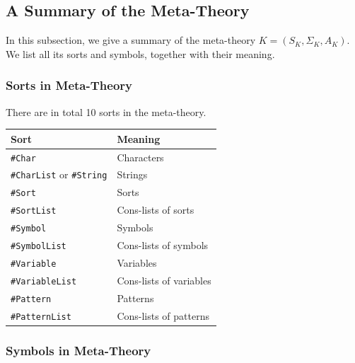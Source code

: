 \documentclass[UTF8,11pt]{article}
\theoremstyle{plain}
\theoremstyle{definition}
\theoremstyle{remark}
\newcommand{\sharpsymbol}{\#}
\newcommand{\KChar}{\texttt{\sharpsymbol Char}}
\newcommand{\KCharList}{\texttt{\sharpsymbol CharList}}
\newcommand{\KString}{\texttt{\sharpsymbol String}}
\newcommand{\KSort}{\texttt{\sharpsymbol Sort}}
\newcommand{\KSymbol}{\texttt{\sharpsymbol Symbol}}
\newcommand{\KPatternList}{\texttt{\sharpsymbol PatternList}}
\newcommand{\KSortList}{\texttt{\sharpsymbol SortList}}
\newcommand{\KSymbolList}{\texttt{\sharpsymbol SymbolList}}
\newcommand{\KVariableList}{\texttt{\sharpsymbol VariableList}}
\newcommand{\KVariable}{\texttt{\sharpsymbol Variable}}
\newcommand{\KPattern}{\texttt{\sharpsymbol Pattern}}
\begin{document}
\subsection{A Summary of the Meta-Theory}
\label{sec:K-summary}
In this subsection, we give a summary of the meta-theory $K = (S_K, \Sigma_K, 
A_K)$.
We list all its sorts and symbols, together with their meaning.

\subsubsection{Sorts in Meta-Theory}
There are in total 10 sorts in the meta-theory.
\begin{center}
	\begin{tabular}{l|l}
		\textbf{Sort} & \textbf{Meaning} \\
		\hline
		\KChar & Characters \\
		{\KCharList} or \KString & Strings \\
		\KSort & Sorts \\
		\KSortList & Cons-lists of sorts \\
		\KSymbol & Symbols \\
		\KSymbolList & Cons-lists of symbols \\
		\KVariable & Variables \\
		\KVariableList & Cons-lists of variables \\
		\KPattern & Patterns \\
		\KPatternList & Cons-lists of patterns \\
	\end{tabular}
\end{center}

\subsubsection{Symbols in Meta-Theory}
\end{document}
